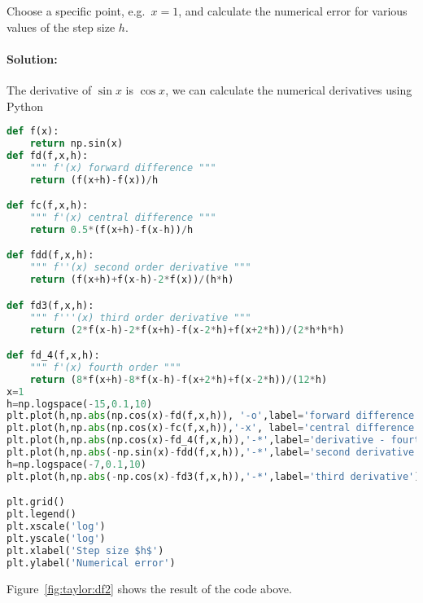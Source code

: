 \documentclass[graybox,sectrefs,envcountresetchap,open=right,final]{svmonodo}
\newenvironment{graybox2admon}[1][]{
\begin{graybox2mdframed}[frametitle=#1]
}
{
\end{graybox2mdframed}
}
\begin{document}
\begin{graybox2admon}[Example: calculate the numerical derivative and second derivative of $\sin x$]
Choose a specific point, e.g.~$x=1$, and calculate the numerical error for various values of the step size $h$.
\paragraph{Solution:}
The derivative of $\sin x$ is $\cos x$, we can calculate the numerical derivatives using Python






































\begin{lstlisting}[language=python,style=blue1]
def f(x):
    return np.sin(x)
def fd(f,x,h):
    """ f'(x) forward difference """
    return (f(x+h)-f(x))/h

def fc(f,x,h):
    """ f'(x) central difference """
    return 0.5*(f(x+h)-f(x-h))/h

def fdd(f,x,h):
    """ f''(x) second order derivative """
    return (f(x+h)+f(x-h)-2*f(x))/(h*h)

def fd3(f,x,h):
    """ f'''(x) third order derivative """
    return (2*f(x-h)-2*f(x+h)-f(x-2*h)+f(x+2*h))/(2*h*h*h)

def fd_4(f,x,h):
    """ f'(x) fourth order """
    return (8*f(x+h)-8*f(x-h)-f(x+2*h)+f(x-2*h))/(12*h)
x=1
h=np.logspace(-15,0.1,10)
plt.plot(h,np.abs(np.cos(x)-fd(f,x,h)), '-o',label='forward difference')
plt.plot(h,np.abs(np.cos(x)-fc(f,x,h)),'-x', label='central difference')
plt.plot(h,np.abs(np.cos(x)-fd_4(f,x,h)),'-*',label='derivative - fourth order')
plt.plot(h,np.abs(-np.sin(x)-fdd(f,x,h)),'-*',label='second derivative')
h=np.logspace(-7,0.1,10)
plt.plot(h,np.abs(-np.cos(x)-fd3(f,x,h)),'-*',label='third derivative')

plt.grid()
plt.legend()
plt.xscale('log')
plt.yscale('log')
plt.xlabel('Step size $h$')
plt.ylabel('Numerical error')

\end{lstlisting}


Figure~\ref{fig:taylor:df2} shows the result of the code above.
\end{graybox2admon}
\end{document}
